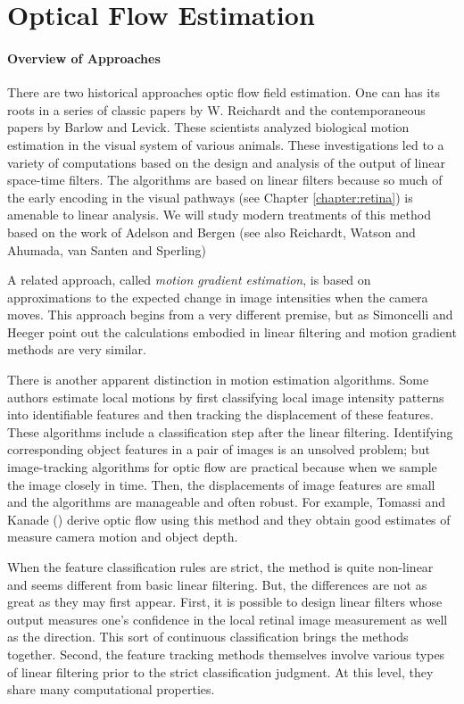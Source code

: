 %
%
%
\section{Optical Flow Estimation}
\paragraph{Overview of Approaches}
There are two historical approaches
optic flow field estimation.
One can has its roots in a series of classic papers
by W. Reichardt and the contemporaneous papers by
Barlow and Levick.
These scientists
analyzed biological motion estimation
in the visual system of various animals.
These investigations led to a variety of
computations based on the design and analysis
of the output of linear space-time filters.
The algorithms are based on linear filters
because so much of the early encoding in the visual
pathways (see Chapter \ref{chapter:retina}) is amenable
to linear analysis.
We will study modern treatments
of this method based on the work
of Adelson and Bergen (see also 
Reichardt, Watson and Ahumada, van Santen and
Sperling)

A related approach, called {\em motion gradient estimation},
is based on approximations to 
the expected change in image intensities when
the camera moves.
This approach begins from a very different
premise, but
as Simoncelli and Heeger point out the calculations
embodied in linear filtering and motion gradient
methods are very similar.

There is another apparent distinction in motion
estimation algorithms.
Some authors estimate local motions by
first classifying local image intensity patterns
into identifiable features and then tracking the
displacement of these features.
These algorithms include a classification step
after the linear filtering.
Identifying corresponding object features
in a pair of images is an unsolved problem;
but image-tracking algorithms for optic flow are practical
because when we sample the image closely in time.
Then, the displacements of
image features are small and the algorithms are manageable
and often robust.
For example, Tomassi and Kanade () derive optic flow using this method
and they obtain good estimates of
measure camera motion and object depth.

When the feature classification rules
are strict, the method is quite non-linear and
seems different from basic linear filtering.
But, the differences are not as great as they
may first appear.
First, it is possible to design
linear filters whose output measures
one's confidence in the local retinal image measurement
as well as the direction.
This sort of continuous classification brings the methods
together.
Second, the feature tracking methods themselves involve
various types of linear filtering prior to the strict
classification judgment.
At this level, they share many computational properties.

